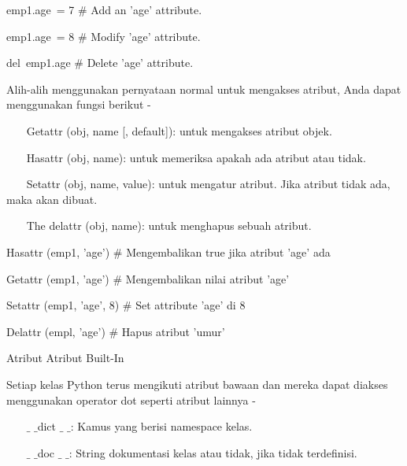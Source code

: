 \begin {enumerate}
\noindent 
emp1.age~= 7   $  \#  $ Add an 'age' attribute. \par
\noindent 
emp1.age~= 8   $  \#  $ Modify 'age' attribute. \par
\noindent 
del~emp1.age   $  \#  $ Delete 'age' attribute. \par
\vspace{12pt}
Alih-alih menggunakan pernyataan normal untuk mengakses atribut, Anda dapat menggunakan fungsi berikut - \par
\vspace{12pt}
\noindent 
~~~ Getattr (obj, name [, default]): untuk mengakses atribut objek. \par
\vspace{12pt}
\noindent 
~~~ Hasattr (obj, name): untuk memeriksa apakah ada atribut atau tidak. \par
\vspace{12pt}
\noindent 
~~~ Setattr (obj, name, value): untuk mengatur atribut. Jika atribut tidak ada, maka akan dibuat. \par
\vspace{12pt}
\noindent 
~~~ The delattr (obj, name): untuk menghapus sebuah atribut. \par
\vspace{12pt}
\noindent 
Hasattr (emp1, 'age')  $  \#  $ Mengembalikan true jika atribut 'age' ada \par
\noindent 
Getattr (emp1, 'age')  $  \#  $ Mengembalikan nilai atribut 'age' \par
\noindent 
Setattr (emp1, 'age', 8)  $  \#  $ Set attribute 'age' di 8 \par
\noindent 
Delattr (empl, 'age')  $  \#  $ Hapus atribut 'umur' \par
\vspace{12pt}
\noindent 
Atribut Atribut Built-In \par
\vspace{12pt}
\noindent 
Setiap kelas Python terus mengikuti atribut bawaan dan mereka dapat diakses menggunakan operator dot seperti atribut lainnya - \par
\vspace{12pt}
\noindent 
~~~  $  \_  $ $  \_  $dict $  \_  $ $  \_  $: Kamus yang berisi namespace kelas. \par
\vspace{12pt}
\noindent 
~~~  $  \_  $ $  \_  $doc $  \_  $ $  \_  $: String dokumentasi kelas atau tidak, jika tidak terdefinisi. \par
\vspace{12pt}

\end{enumerate}

